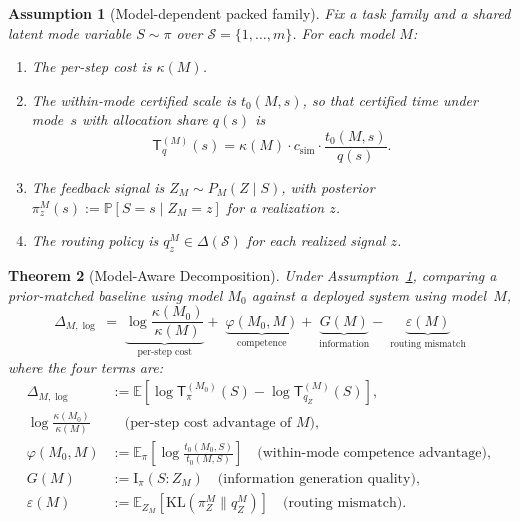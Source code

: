 \documentclass[10pt]{article}
\theoremstyle{paperplain}
\newtheorem{theorem}{Theorem}[section]
\theoremstyle{paperdefinition}
\newtheorem{assumption}[theorem]{Assumption}
\theoremstyle{paperremark}
\newcommand{\KL}{\mathrm{KL}}
\newcommand{\I}{\mathrm{I}}
\newcommand{\E}{\mathbb{E}}
\newcommand{\Prb}{\mathbb{P}}
\newcommand{\cS}{\mathcal{S}}
\newcommand{\DlogM}{\Delta_{M,\log}}
\begin{document}
\begin{assumption}[Model-dependent packed family]
\label{ass:model-packed-family}
Fix a task family and a shared latent mode variable $S \sim \pi$ over $\cS=\{1,\ldots,m\}$.
For each model $M$:
\begin{enumerate}
\item The per-step cost is $\kappa(M)$.
\item The within-mode certified scale is $t_0(M,s)$, so that certified time under mode~$s$ with allocation share $q(s)$ is
\[
\mathsf{T}_q^{(M)}(s) = \kappa(M) \cdot c_{\mathrm{sim}} \cdot \frac{t_0(M,s)}{q(s)}.
\]
\item The feedback signal is $Z_M \sim P_M(Z \mid S)$, with posterior $\pi_z^M(s) := \Prb[S = s \mid Z_M = z]$ for a realization $z$.
\item The routing policy is $q_z^M \in \Delta(\cS)$ for each realized signal $z$.
\end{enumerate}
\end{assumption}

\begin{theorem}[Model-Aware Decomposition]
\label{thm:four-term}
Under Assumption~\ref{ass:model-packed-family}, comparing a prior-matched baseline using model $M_0$ against a deployed system using model~$M$,
\begin{equation}
\label{eq:four-term}
\boxed{\;
\DlogM \;=\;
\underbrace{\log\frac{\kappa(M_0)}{\kappa(M)}}_{\text{per-step cost}}
+\;
\underbrace{\varphi(M_0,M)}_{\text{competence}}
+\;
\underbrace{G(M)}_{\text{information}}
-\;
\underbrace{\varepsilon(M)}_{\text{routing mismatch}}
\;}
\end{equation}
where the four terms are:
\begin{align}
\DlogM &:= \E\!\left[\log \mathsf{T}_\pi^{(M_0)}(S)-\log \mathsf{T}_{q_Z}^{(M)}(S)\right], \nonumber\\
\log\frac{\kappa(M_0)}{\kappa(M)} &\quad\text{(per-step cost advantage of }M\text{)}, \label{eq:kappa-term} \\
\varphi(M_0,M) &:= \E_\pi\!\left[\log\frac{t_0(M_0,S)}{t_0(M,S)}\right] \quad\text{(within-mode competence advantage)}, \label{eq:phi-term} \\
G(M) &:= \I_\pi(S : Z_M) \quad\text{(information generation quality)}, \label{eq:G-term} \\
\varepsilon(M) &:= \E_{Z_M}\!\left[\KL(\pi_Z^M \| q_Z^M)\right] \quad\text{(routing mismatch)}. \label{eq:eps-term}
\end{align}
\end{theorem}
\end{document}
